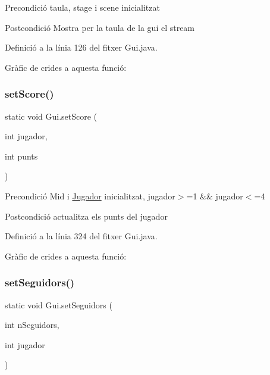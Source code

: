 \begin{DoxyPrecond}{Precondició}
taula, stage i scene inicialitzat 
\end{DoxyPrecond}
\begin{DoxyPostcond}{Postcondició}
Mostra per la taula de la gui el stream 
\end{DoxyPostcond}


Definició a la línia 126 del fitxer Gui.\+java.

Gràfic de crides a aquesta funció\+:
\mbox{\label{class_gui_ab7fd6a1b1d5fa17562ceed182a64b7c8}} 
\subsubsection{\texorpdfstring{set\+Score()}{setScore()}}
{\footnotesize\ttfamily static void Gui.\+set\+Score (\begin{DoxyParamCaption}\item[{int}]{jugador,  }\item[{int}]{punts }\end{DoxyParamCaption})\hspace{0.3cm}{\ttfamily [static]}}

\begin{DoxyPrecond}{Precondició}
Mid i \mbox{\hyperlink{class_jugador}{Jugador}} inicialitzat, jugador$>$=1 \&\& jugador$<$=4 
\end{DoxyPrecond}
\begin{DoxyPostcond}{Postcondició}
actualitza els punts del jugador 
\end{DoxyPostcond}


Definició a la línia 324 del fitxer Gui.\+java.

Gràfic de crides a aquesta funció\+:
\mbox{\label{class_gui_a1a14232efb129ae4577c477395f6a09e}} 
\subsubsection{\texorpdfstring{set\+Seguidors()}{setSeguidors()}}
{\footnotesize\ttfamily static void Gui.\+set\+Seguidors (\begin{DoxyParamCaption}\item[{int}]{n\+Seguidors,  }\item[{int}]{jugador }\end{DoxyParamCaption})\hspace{0.3cm}{\ttfamily [static]}}

